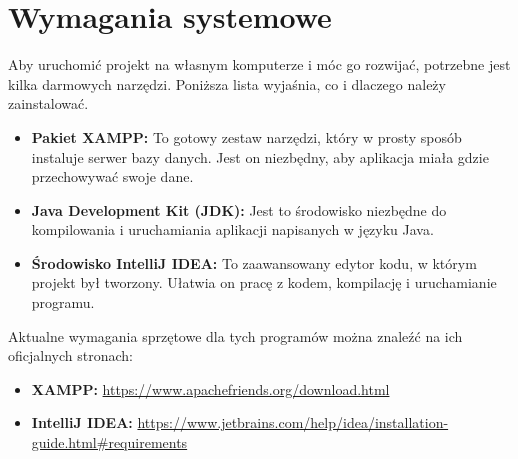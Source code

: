 \section{Wymagania systemowe}
Aby uruchomić projekt na własnym komputerze i móc go rozwijać, potrzebne jest kilka darmowych narzędzi. Poniższa lista wyjaśnia, co i dlaczego należy zainstalować.
\begin{itemize}
    \item \textbf{Pakiet XAMPP:} To gotowy zestaw narzędzi, który w prosty sposób instaluje serwer bazy danych. Jest on niezbędny, aby aplikacja miała gdzie przechowywać swoje dane.
    \item \textbf{Java Development Kit (JDK):} Jest to środowisko niezbędne do kompilowania i uruchamiania aplikacji napisanych w języku Java.
    \item \textbf{Środowisko IntelliJ IDEA:} To zaawansowany edytor kodu, w którym projekt był tworzony. Ułatwia on pracę z kodem, kompilację i uruchamianie programu.
\end{itemize}
Aktualne wymagania sprzętowe dla tych programów można znaleźć na ich oficjalnych stronach:
\begin{itemize}
    \item \textbf{XAMPP:} \url{https://www.apachefriends.org/download.html}
    \item \textbf{IntelliJ IDEA:} \url{https://www.jetbrains.com/help/idea/installation-guide.html#requirements}
\end{itemize}
